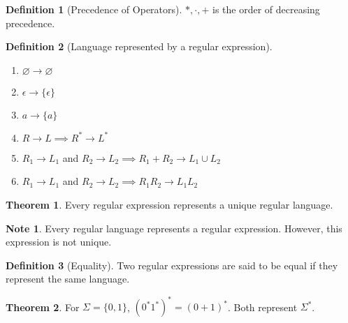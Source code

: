 \documentclass[10pt, a4paper]{extarticle}
\theoremstyle{definition}
\newtheorem{thm}{Theorem}
\newtheorem{defn}{Definition}
\newtheorem*{note*}{Note}
\begin{document}
\begin{defn}[Precedence of Operators]
	$*,\cdot,+$ is the order of decreasing precedence.
\end{defn}

\begin{defn}[Language represented by a regular expression]
	\hfill
	\begin{enumerate}
		\item $\varnothing\rightarrow\varnothing$
		\item $\epsilon\rightarrow\{\epsilon\}$
		\item $a\rightarrow \{a\}$
		\item $R\rightarrow L\implies R^*\rightarrow L^*$
		\item $R_1\rightarrow L_1$ and $R_2\rightarrow L_2\implies R_1+R_2\rightarrow L_1\cup L_2$
		\item $R_1\rightarrow L_1$ and $R_2\rightarrow L_2\implies R_1R_2\rightarrow L_1L_2$
	\end{enumerate}
\end{defn}

\begin{thm}
	Every regular expression represents a unique regular language.
\end{thm}
\begin{note*}
	Every regular language represents a regular expression. However, this expression is not unique.
\end{note*}

\begin{defn}[Equality]
	Two regular expressions are said to be equal if they represent the same language.
\end{defn}

\begin{thm}
	For $\Sigma=\{0,1\}$, $(0^*1^*)^*=(0+1)^*$. Both represent $\Sigma^*$.
\end{thm}
\end{document}

